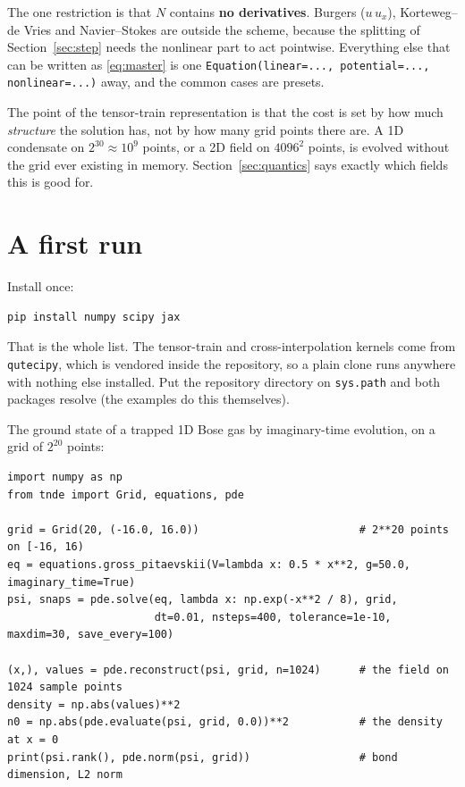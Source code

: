 \documentclass[11pt,a4paper]{article}
\newcommand{\code}[1]{\texttt{#1}}
\begin{document}
The one restriction is that $N$ contains \textbf{no derivatives}. Burgers ($u\,u_x$),
Korteweg--de Vries and Navier--Stokes are outside the scheme, because the splitting of
Section~\ref{sec:step} needs the nonlinear part to act pointwise. Everything else that
can be written as \eqref{eq:master} is one
\code{Equation(linear=..., potential=..., nonlinear=...)} away, and the common cases
are presets.

The point of the tensor-train representation is that the cost is set by how much
\emph{structure} the solution has, not by how many grid points there are. A 1D
condensate on $2^{30}\approx10^9$ points, or a 2D field on $4096^2$ points, is evolved
without the grid ever existing in memory. Section~\ref{sec:quantics} says exactly which
fields this is good for.

\section{A first run}

Install once:
\begin{lstlisting}[language=bash]
pip install numpy scipy jax
\end{lstlisting}
That is the whole list. The tensor-train and cross-interpolation kernels come from
\code{qutecipy}, which is vendored inside the repository, so a plain clone runs anywhere
with nothing else installed. Put the repository directory on \code{sys.path} and both
packages resolve (the examples do this themselves).

The ground state of a trapped 1D Bose gas by imaginary-time evolution, on a grid of
$2^{20}$ points:
\begin{lstlisting}
import numpy as np
from tnde import Grid, equations, pde

grid = Grid(20, (-16.0, 16.0))                         # 2**20 points on [-16, 16)
eq = equations.gross_pitaevskii(V=lambda x: 0.5 * x**2, g=50.0, imaginary_time=True)
psi, snaps = pde.solve(eq, lambda x: np.exp(-x**2 / 8), grid,
                       dt=0.01, nsteps=400, tolerance=1e-10, maxdim=30, save_every=100)

(x,), values = pde.reconstruct(psi, grid, n=1024)      # the field on 1024 sample points
density = np.abs(values)**2
n0 = np.abs(pde.evaluate(psi, grid, 0.0))**2           # the density at x = 0
print(psi.rank(), pde.norm(psi, grid))                 # bond dimension, L2 norm
\end{lstlisting}
\end{document}
